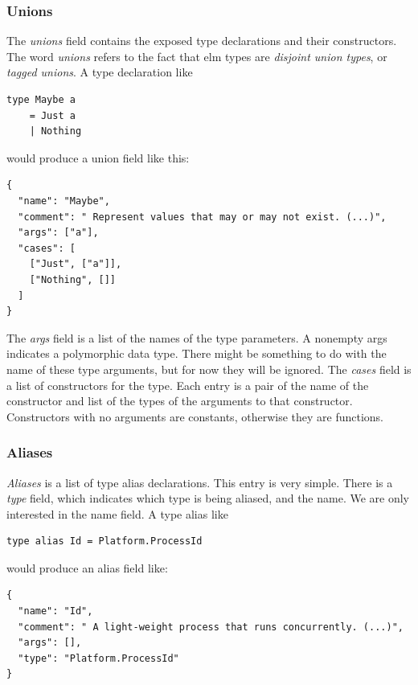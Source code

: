 \documentclass[../thesis.tex]{subfiles}
\begin{document}
\subsubsection{Unions}\label{unions}
The \textit{unions} field contains the exposed type declarations and their constructors.
The word \textit{unions} refers to the fact that elm types are \textit{disjoint union types}, or \textit{tagged unions}.
A type declaration like
\begin{verbatim}
type Maybe a
    = Just a
    | Nothing
\end{verbatim}
would produce a union field like this: 
\begin{verbatim}
{
  "name": "Maybe",
  "comment": " Represent values that may or may not exist. (...)",
  "args": ["a"],
  "cases": [
    ["Just", ["a"]],
    ["Nothing", []]
  ]
}
\end{verbatim}
The \textit{args} field is a list of the names of the type parameters.
A nonempty args indicates a polymorphic data type.
There might be something to do with the name of these type arguments, but for now they will be ignored.
The \textit{cases} field is a list of constructors for the type.
Each entry is a pair of the name of the constructor and list of the types of the arguments to that constructor.
Constructors with no arguments are constants, otherwise they are functions.

\subsubsection{Aliases}\label{aliases}
\textit{Aliases} is a list of type alias declarations.
This entry is very simple.
There is a \textit{type} field, which indicates which type is being aliased, and the name.
We are only interested in the name field.
A type alias like
\begin{verbatim}
type alias Id = Platform.ProcessId
\end{verbatim}
would produce an alias field like:
\begin{verbatim}
{
  "name": "Id",
  "comment": " A light-weight process that runs concurrently. (...)",
  "args": [],
  "type": "Platform.ProcessId"
}
\end{verbatim}
\end{document}
